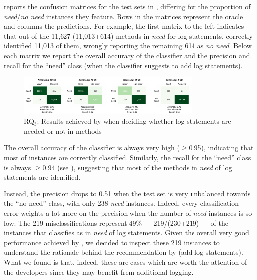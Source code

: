  reports the confusion matrices for the test sets in , differing for the proportion of \emph{need}/\emph{no need} instances they feature. Rows in the matrices represent the oracle and columns the predictions. For example, the first matrix to the left indicates that out of the 11,627 (11,013+614) methods in \emph{need} for log statements, \approach correctly identified 11,013 of them, wrongly reporting the remaining 614 as \emph{no need}. Below each matrix we report the overall accuracy of the classifier and the precision and recall for the ``need'' class (\ie when the classifier suggests to add log statements).  

\begin{figure}[t]
	\centering
	\includegraphics[width=0.8\textwidth]{img/RQ3-CM.pdf}
	\caption{RQ$_3$: Results achieved by \approach when deciding whether log statements are needed or not in \java methods}
	\label{fig:rq3-cm}
	\vspace{-0.3cm}
\end{figure}

The overall accuracy of the classifier is always very high ($\geq$0.95), indicating that most of instances are correctly classified. Similarly, the recall for the ``need'' class is always $\geq$0.94 (see ), suggesting that most of the methods in \emph{need} of log statements are identified. 

Instead, the precision drops to 0.51 when the test set is very unbalanced towards the ``no need'' class, with only 238 \emph{need} instances. Indeed, every classification error weights a lot more on the precision when the number of \emph{need} instances is so low: The 219 misclassifications represent 49\% --- 219/(230+219) --- of the instances that \approach classifies as in \emph{need} of log statements. Given the overall very good performance achieved by \approach, we decided to inspect these 219 instances to understand the rationale behind the recommendation by \approach (\ie add log statements). What we found is that, indeed, these are cases which are worth the attention of the developers since they may benefit from additional logging. 

